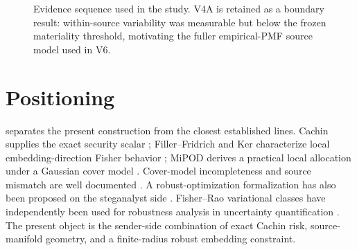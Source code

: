 \documentclass[10pt]{article}
\begin{document}
\begin{figure}[t]
\centering
{}
\caption{Evidence sequence used in the study. V4A is retained as a boundary result: within-source variability was measurable but below the frozen materiality threshold, motivating the fuller empirical-PMF source model used in V6.}
\label{fig:evidence}
\end{figure}

\section{Positioning}
 separates the present construction from the closest established lines. Cachin supplies the exact security scalar \cite{cachin2004}; Filler--Fridrich and Ker characterize local embedding-direction Fisher behavior \cite{filler2009icas,filler2009ih,ker2009}; MiPOD derives a practical local allocation under a Gaussian cover model \cite{sedighi2016}. Cover-model incompleteness and source mismatch are well documented \cite{kodovsky2011,sedighi2016boss,giboulot2020,mallet2024}. A robust-optimization formalization has also been proposed on the steganalyst side \cite{sepak2022}. Fisher--Rao variational classes have independently been used for robustness analysis in uncertainty quantification \cite{ketema2025}. The present object is the sender-side combination of exact Cachin risk, source-manifold geometry, and a finite-radius robust embedding constraint.
\end{document}
